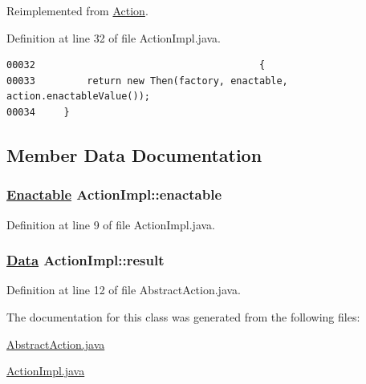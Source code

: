 Reimplemented from \hyperlink{interfaceAction_a2}{Action}.

Definition at line 32 of file Action\-Impl.java.\footnotesize\begin{verbatim}00032                                       {
00033         return new Then(factory, enactable, action.enactableValue());
00034     }
\end{verbatim}\normalsize 


\subsection{Member Data Documentation}
\hypertarget{classActionImpl_o1}{
\subsubsection[enactable]{\setlength{\rightskip}{0pt plus 5cm}\hyperlink{interfaceEnactable}{Enactable} Action\-Impl::enactable}}
\label{classActionImpl_o1}




Definition at line 9 of file Action\-Impl.java.\hypertarget{classActionImpl_o0}{
\subsubsection[result]{\setlength{\rightskip}{0pt plus 5cm}\hyperlink{interfaceData}{Data} Action\-Impl::result}}
\label{classActionImpl_o0}




Definition at line 12 of file Abstract\-Action.java.

The documentation for this class was generated from the following files:\begin{CompactItemize}
\item 
\hyperlink{AbstractAction_8java-source}{Abstract\-Action.java}\item 
\hyperlink{ActionImpl_8java-source}{Action\-Impl.java}\end{CompactItemize}
